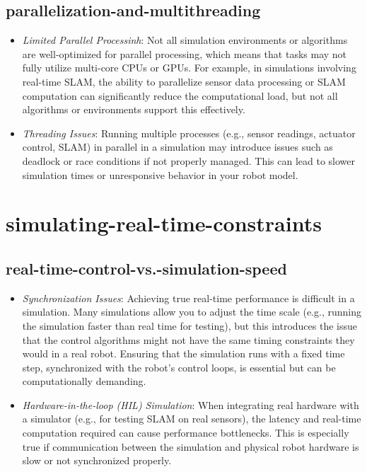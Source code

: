 \documentclass[../../main]{subfiles}
\begin{document}
    \subsection{parallelization-and-multithreading}
    \begin{itemize}
    \item
      \emph{Limited Parallel Processinh}: Not all simulation environments
      or algorithms are well-optimized for parallel processing, which means
      that tasks may not fully utilize multi-core CPUs or GPUs. For example,
      in simulations involving real-time SLAM, the ability to parallelize
      sensor data processing or SLAM computation can significantly reduce
      the computational load, but not all algorithms or environments support
      this effectively.
    \item
      \emph{Threading Issues}: Running multiple processes (e.g., sensor
      readings, actuator control, SLAM) in parallel in a simulation may
      introduce issues such as deadlock or race conditions if not properly
      managed. This can lead to slower simulation times or unresponsive
      behavior in your robot model.
    \end{itemize}
    
    \section{simulating-real-time-constraints}
    
    \subsection{real-time-control-vs.-simulation-speed}
    \begin{itemize}
    \item
      \emph{Synchronization Issues}: Achieving true real-time performance
      is difficult in a simulation. Many simulations allow you to adjust the
      time scale (e.g., running the simulation faster than real time for
      testing), but this introduces the issue that the control algorithms
      might not have the same timing constraints they would in a real robot.
      Ensuring that the simulation runs with a fixed time step, synchronized
      with the robot's control loops, is essential but can be
      computationally demanding.
    \item
      \emph{Hardware-in-the-loop (HIL) Simulation}: When integrating real
      hardware with a simulator (e.g., for testing SLAM on real sensors),
      the latency and real-time computation required can cause performance
      bottlenecks. This is especially true if communication between the
      simulation and physical robot hardware is slow or not synchronized
      properly.
    \end{itemize}
\end{document}
